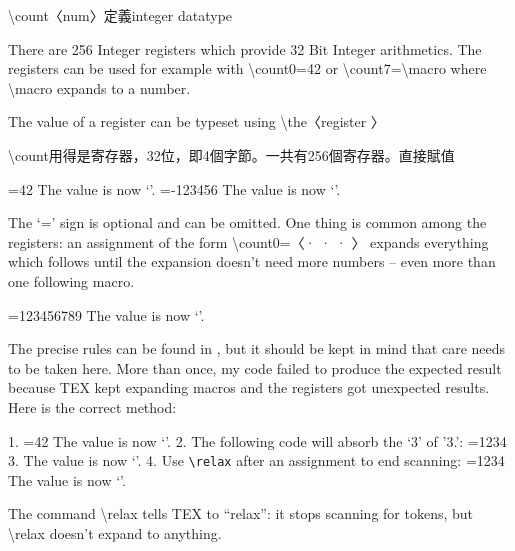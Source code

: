 \textbackslash  count〈num〉定義integer datatype

There are 256 Integer registers which provide 32 Bit Integer arithmetics. The registers can be used for
example with \textbackslash  count0=42 or \textbackslash  count7=\textbackslash  macro where \textbackslash  macro expands to a number.

The value of a register can be typeset using \textbackslash  the〈register 〉

\textbackslash count用得是寄存器，32位，即4個字節。一共有256個寄存器。直接賦值

\begin{Example}
=42
The value is now ‘\the{}’.
\def\macro{-123456}
=\macro
The value is now ‘\the{}’.
\end{Example}

The ‘=’ sign is optional and can be omitted. One thing is common among the registers: an assignment
of the form \textbackslash count0=〈· · · 〉 expands everything which follows until the expansion doesn’t need more
numbers – even more than one following macro.

\begin{Example}
\def\firstmacro{123}
\def\secondmacro{456}
\def\thirdmacro{789}
=\firstmacro\secondmacro\thirdmacro
The value is now ‘\the{}’.
\end{Example}
The precise rules can be found in , but it should be kept in mind that care needs to be taken here.
More than once, my code failed to produce the expected result because TEX kept expanding macros
and the registers got unexpected results. Here is the correct method:

\begin{Example}
1. =42 %
The value is now ‘\the{}’.
2. The following code will absorb the ‘3’ of ’3.’:
\def\macro{1234}
=\macro %
3. The value is now ‘\the{}’.
4. Use \verb"\relax" after an assignment to end scanning:
=\macro\relax
The value is now ‘\the{}’.
\end{Example}
The command \textbackslash relax tells TEX to “relax”: it stops scanning for tokens, but \textbackslash relax doesn’t expand to
anything.
